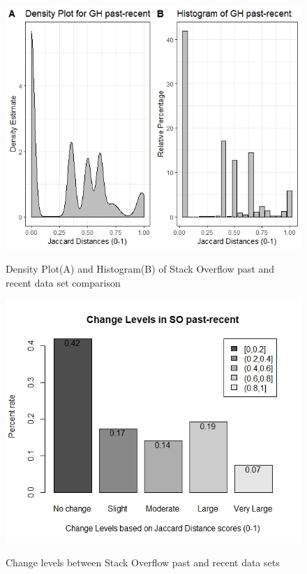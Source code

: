         \begin{figure}
          \centering
          \includegraphics[width=\textwidth]{figures/SO_past-recent.jpeg}\\
          \caption{Density Plot(A) and Histogram(B) of Stack Overflow past and recent data set comparison}
          \label{fig:SO_past_recent}
        \end{figure}
        
        \begin{figure}
          \centering
          \includegraphics[width=\textwidth]{figures/change_levels_SO_past-recent.jpeg}\\
          \caption{Change levels between Stack Overflow past and recent data sets}
          \label{fig:change_SO_past_recent}
        \end{figure}
        
